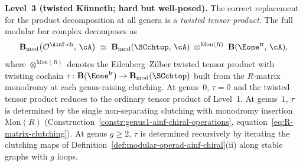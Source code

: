 \begin{remark}
\medskip\noindent
\textbf{Level~3 (twisted K\"unneth; hard but well-posed).}
The correct replacement for the product decomposition
at all genera is a \emph{twisted tensor product}.
The full modular bar complex decomposes as
\begin{equation}\label{eq:twisted-kunneth-bar}
 \mathbf{B}_{\mathrm{mod}}\bigl(
 \mathcal{O}^{\Ainf\text{-ch}},\, \cA\bigr)
 \;\simeq\;
 \mathbf{B}_{\mathrm{mod}}(\SCchtop,\, \cA)
 \;\otimes^{\mathrm{Mon}(R)}\;
 \mathbf{B}(\Eone^{\mathsf{tr}},\, \cA),
\end{equation}
where $\otimes^{\mathrm{Mon}(R)}$ denotes the
Eilenberg--Zilber twisted tensor product with
twisting cochain
$\tau \colon
\mathbf{B}(\Eone^{\mathsf{tr}}) \to
\mathbf{B}_{\mathrm{mod}}(\SCchtop)$
built from the $R$-matrix monodromy at each
genus-raising clutching.
At genus~$0$, $\tau = 0$ and the twisted tensor
product reduces to the ordinary tensor product of
Level~1.
At genus~$1$, $\tau$ is determined by the single
non-separating clutching with monodromy insertion
$\mathrm{Mon}(R)$
(Construction~\ref{constr:genus1-ainf-chiral-operations},
equation~\eqref{eq:R-matrix-clutching}).
At genus $g \ge 2$, $\tau$ is determined recursively
by iterating the clutching maps of
Definition~\ref{def:modular-operad-ainf-chiral}(ii)
along stable graphs with $g$ loops.


\end{remark}
